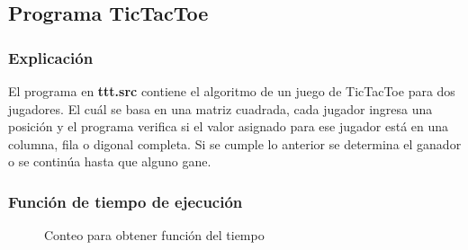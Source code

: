 \documentclass[11pt]{article}
\begin{document}
\subsection{Programa TicTacToe}
\subsubsection{Explicación}
El programa en \textbf{ttt.src} contiene el algoritmo de un juego de TicTacToe para dos jugadores. El cuál se basa en una matriz cuadrada, cada jugador ingresa una posición y el programa verifica si el valor asignado para ese jugador está en una columna, fila o digonal completa. Si se cumple lo anterior se determina el ganador o se continúa hasta que alguno gane.
\subsubsection{Función de tiempo de ejecución}

\begin{figure}[H]
\centering
{}
\caption{Conteo para obtener función del tiempo}
\label{fig:cont}
\end{figure}
 
\end{document}
